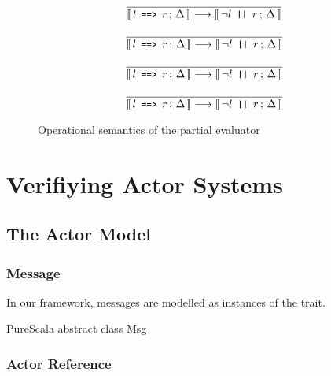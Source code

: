 \begin{figure}
\begin{framed}
\begin{equation}
\dfrac{
  \empty
}{
  \lb{\stt{$l$ ==> $r$}}{\Delta} \longrightarrow \lb{\neg l \stt{ || } r}{\Delta}
}
\end{equation}

\begin{equation}
\dfrac{
  \empty
}{
  \lb{l \stt{ ==> } r}{\Delta} \longrightarrow \lb{\neg l \stt{ || } r}{\Delta}
}
\end{equation}

\begin{equation}
\dfrac{
  \empty
}{
  \lb{l \stt{ ==> } r}{\Delta} \longrightarrow \lb{\neg l \stt{ || } r}{\Delta}
}
\end{equation}

\begin{equation}
\dfrac{
  \empty
}{
  \lb{l \stt{ ==> } r}{\Delta} \longrightarrow \lb{\neg l \stt{ || } r}{\Delta}
}
\end{equation}

\end{framed}
\vspace{-10pt}
\caption{Operational semantics of the partial evaluator \label{fig:partialsem}}
\end{figure}


\section{Verifiying Actor Systems}
\label{actors}

\subsection{The Actor Model}


\cite{actario} \cite{verdi} \cite{akka}

\subsubsection*{Message}

In our framework, messages are modelled as instances of the  trait.

\begin{ShortCode}{PureScala}
abstract class Msg
\end{ShortCode}

\subsubsection*{Actor Reference}

